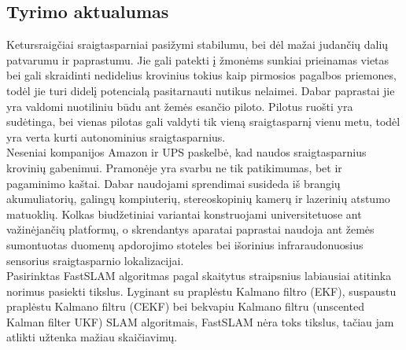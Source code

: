 \documentclass[a4paper, 12pt]{article} %
\begin{document}
\begin{onehalfspacing}
  
\section{Tyrimo aktualumas}
Ketursraig\v{c}iai sraigtasparniai pasi\v{z}ymi stabilumu, bei d\.el ma\v{z}ai
 judan\v{c}i\k{u} dali\k{u} patvarumu ir paprastumu. Jie gali patekti \k{i} \v{z}mon\.ems
  sunkiai prieinamas vietas bei gali skraidinti nedidelius krovinius tokius kaip pirmosios
   pagalbos priemones, tod\.el jie turi didel\k{i} potencial\k{a} pasitarnauti nutikus 
   nelaimei. Dabar paprastai jie yra valdomi nuotiliniu b\=udu ant \v{z}em\.es esan\v{c}io
    piloto. Pilotus ruo\v{s}ti yra sud\.etinga, bei vienas pilotas gali valdyti tik 
    vien\k{a} sraigtasparn\k{i} vienu metu, tod\.el yra verta kurti 
    autonominius sraigtasparnius.\\
    \indent Neseniai kompanijos Amazon ir UPS paskelb\.e, kad naudos sraigtasparnius krovini\k{u} gabenimui. Pramon\.eje yra svarbu ne tik patikimumas, bet ir pagaminimo ka\v{s}tai. Dabar naudojami sprendimai susideda i\v{s} brangi\k{u} akumuliatori\k{u}, galing\k{u} kompiuteri\k{u}, stereoskopini\k{u} kamer\k{u} ir lazerini\k{u} atstumo matuokli\k{u}\cite{Nguyen2007}. Kolkas biud\v{z}etiniai variantai konstruojami universitetuose ant va\v{z}in\.ejan\v{c}i\k{u} platform\k{u}\cite{Vincke2010a}\cite{Longchamp2010}, o skrendantys aparatai paprastai naudoja ant \v{z}em\.es sumontuotas duomen\k{u} apdorojimo stoteles bei i\v{s}orinius infraraudonuosius sensorius sraigtasparnio lokalizacijai.
    \\
    \indent Pasirinktas FastSLAM algoritmas pagal skaitytus straipsnius labiausiai atitinka norimus pasiekti tikslus. Lyginant su prapl\.estu Kalmano filtro (EKF), suspaustu prapl\.estu Kalmano filtru (CEKF) bei bekvapiu Kalmano filtru (unscented Kalman filter UKF)\cite{6389151} SLAM algoritmais, FastSLAM n\.era toks tikslus, ta\v{c}iau jam atlikti u\v{z}tenka ma\v{z}iau skai\v{c}iavim\k{u}\cite{Zikos2011}. 



\end{onehalfspacing}
\end{document}
